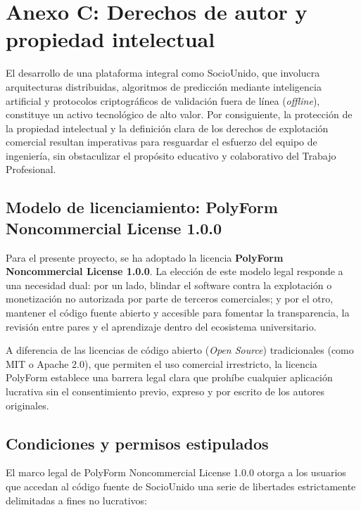 \section{Anexo C: Derechos de autor y propiedad intelectual}

El desarrollo de una plataforma integral como SocioUnido, que involucra arquitecturas distribuidas, algoritmos de predicción mediante inteligencia artificial y protocolos criptográficos de validación fuera de línea (\textit{offline}), constituye un activo tecnológico de alto valor. Por consiguiente, la protección de la propiedad intelectual y la definición clara de los derechos de explotación comercial resultan imperativas para resguardar el esfuerzo del equipo de ingeniería, sin obstaculizar el propósito educativo y colaborativo del Trabajo Profesional.

\subsection{Modelo de licenciamiento: PolyForm Noncommercial License 1.0.0}

Para el presente proyecto, se ha adoptado la licencia \textbf{PolyForm Noncommercial License 1.0.0}. La elección de este modelo legal responde a una necesidad dual: por un lado, blindar el software contra la explotación o monetización no autorizada por parte de terceros comerciales; y por el otro, mantener el código fuente abierto y accesible para fomentar la transparencia, la revisión entre pares y el aprendizaje dentro del ecosistema universitario.

A diferencia de las licencias de código abierto (\textit{Open Source}) tradicionales (como MIT o Apache 2.0), que permiten el uso comercial irrestricto, la licencia PolyForm establece una barrera legal clara que prohíbe cualquier aplicación lucrativa sin el consentimiento previo, expreso y por escrito de los autores originales. 

\subsection{Condiciones y permisos estipulados}

El marco legal de PolyForm Noncommercial License 1.0.0 otorga a los usuarios que accedan al código fuente de SocioUnido una serie de libertades estrictamente delimitadas a fines no lucrativos:

